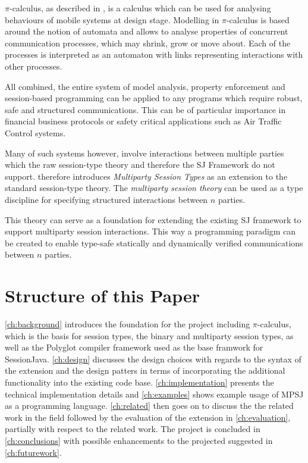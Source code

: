$\pi$-calculus, as described in \cite{pi-calculus}, is a calculus which can be used for analysing behaviours of mobile systems at design stage. Modelling in $\pi$-calculus is based around the notion of automata and allows to analyse properties of concurrent communication processes, which may shrink, grow or move about. Each of the processes is interpreted as an automaton with links representing interactions with other processes.

All combined, the entire system of model analysis, property enforcement and session-based programming can be applied to any programs which require robust, safe and structured communications. This can be of particular importance in financial business protocols or safety critical applications such as Air Traffic Control systems.

Many of such systems however, involve interactions between multiple parties which the raw session-type theory and therefore the SJ Framework do not support. \cite{multiparty_sess_types} therefore introduces \textit{Multiparty Session Types} as an extension to the standard session-type theory. The \textit{multiparty session theory} can be used as a type discipline for specifying structured interactions between $n$ parties.

This theory can serve as a foundation for extending the existing SJ framework to support multiparty session interactions. This way a programming paradigm can be created to enable type-safe statically and dynamically verified communications between $n$ parties. 

\section{Structure of this Paper}

\autoref{ch:background} introduces the foundation for the project including $\pi$-calculus, which is the basis for session types, the binary and multiparty session types, as well as the Polyglot compiler framework used as the base framwork for SessionJava. \autoref{ch:design} discusses the design choices with regards to the syntax of the extension and the design patters in terms of incorporating the additional functionality into the existing code base. \autoref{ch:implementation} presents the technical implementation details and \autoref{ch:examples} shows example usage of MPSJ as a programming language. \autoref{ch:related} then goes on to discuss the the related work in the field followed by the evaluation of the extension in \autoref{ch:evaluation}, partially with respect to the related work. The project is concluded in \autoref{ch:conclusions} with possible enhancements to the projected suggested in \autoref{ch:futurework}.


